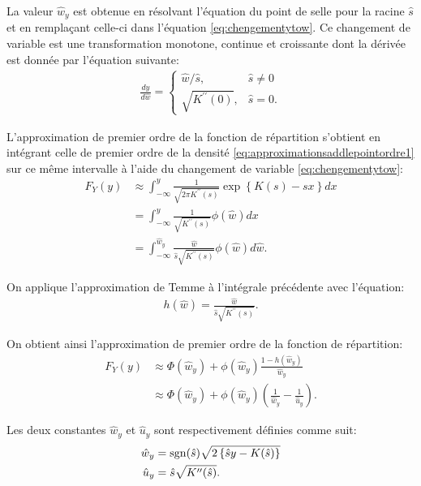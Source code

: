 La valeur $\hat{w}_y$ est obtenue en résolvant l'équation du point de
selle pour la racine $\hat{s}$ et en remplaçant celle-ci dans
l'équation \eqref{eq:chengementytow}.  Ce changement de variable est
une transformation monotone, continue et croissante dont la dérivée
est donnée par l'équation suivante:
\begin{align}
  \label{eq:derivchengementytow}
  \frac{dy}{d\hat{w}} = \begin{cases}
    \hat{w} / \hat{s}, & \hat{s} \neq 0 \\
    \sqrt{K^{\prime\prime}(0)}, & \hat{s} = 0.
  \end{cases}
\end{align}

L'approximation de premier ordre de la fonction de répartition
s'obtient en intégrant celle de premier ordre de la densité
\eqref{eq:approximationsaddlepointordre1} sur ce même intervalle à
l'aide du changement de variable \eqref{eq:chengementytow}:
\begin{align}
  \label{eq:approxintegraleREPordre1}
  F_Y(y) &\approx \int_{-\infty}^{y} \frac{1}{\sqrt{2\pi
      K^{\prime\prime}( s)}}
  \exp{\left\{K( s) -  s x\right\}} dx \nonumber\\
  &= \int_{-\infty}^{y} \frac{1}{\sqrt{K^{\prime\prime}( s)}}
  \phi(\hat{w}) dx \nonumber\\
  &= \int_{-\infty}^{\hat{w}_y}
  \frac{\hat{w}}{\hat{s}\sqrt{K^{\prime\prime}( s)}}\phi(\hat{w})
  d\hat{w}.
\end{align}

On applique l'approximation de Temme à l'intégrale précédente avec
l'équation:
\begin{align*}
  h(\hat{w})=\frac{\hat{w}}{\hat{s}\sqrt{K^{\prime\prime}( s)}}.
\end{align*}

On obtient ainsi l'approximation de premier ordre de la fonction de
répartition:
\begin{align}
  \label{eq:approximationsaddlepointREPordre1}
  F_Y(y) &\approx \Phi(\hat{w}_y) +
  \phi(\hat{w}_y)\frac{1-h(\hat{w}_y)}{\hat{w}_y} \nonumber\\
  & \approx \Phi(\hat{w}_y) + \phi(\hat{w}_y)
  \left(\frac{1}{\hat{w}_y}-\frac{1}{\hat{u}_y} \right).
\end{align}

Les deux constantes $\hat{w}_y$ et $\hat{u}_y$ sont respectivement
définies comme suit:
\begin{subequations}\label{eq:wuysaddlerepart2}
  \begin{align}
    \hat{w}_y &= \operatorname{sgn}(\hat{s})\sqrt{2\left\{\hat{s} y - K(\hat{s})\right\}} \label{eq:wysaddlerepart2}\\
    \hat{u}_y &=
    \hat{s}\sqrt{K^{\prime\prime}(\hat{s})} \label{eq:uysaddlerepart2}.
  \end{align}
\end{subequations}

